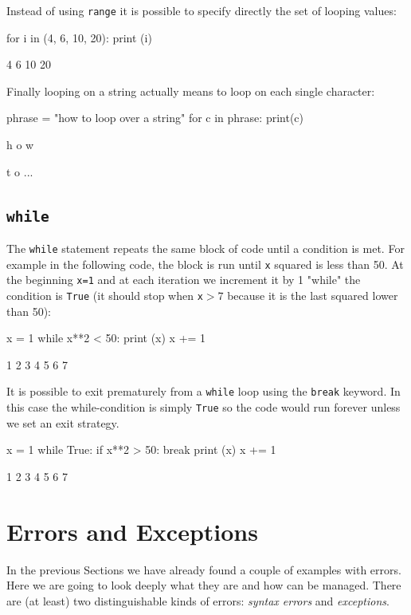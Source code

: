 Instead of using \texttt{range} it is possible to specify directly the set of looping values:

\begin{ipythonnon}
for i in (4, 6, 10, 20):
    print (i)	
\end{ipythonnon}
\begin{ioutput}
4
6
10
20	
\end{ioutput}

Finally looping on a string actually means to loop on each single character:
 
\begin{ipythonnon}
phrase = "how to loop over a string"
for c in phrase:
    print(c) 	
\end{ipythonnon}
\begin{ioutput}
h
o
w

t
o
...
\end{ioutput}
 
\subsection{\texttt{while}}\label{while}

The \texttt{while} statement repeats the same block of code until a condition is met. For example in the following code, the block is run until \texttt{x} squared is less than 50. At the beginning \texttt{x=1} and at each iteration we increment it by 1 "while" the condition is \texttt{True} (it should stop when \texttt{x}$> 7$ because it is the last squared lower than 50):

\begin{ipythonnon}
x = 1
while x**2 < 50:
    print (x)
    x += 1	
\end{ipythonnon}
\begin{ioutput}
1
2
3
4
5
6
7	
\end{ioutput}

It is possible to exit prematurely from a \texttt{while} loop using the \texttt{break} keyword. In this case the while-condition is simply \texttt{True} so the code would run forever unless we set an exit strategy.

\begin{ipythonnon}
x = 1
while True:
    if x**2 > 50:
        break
    print (x)
    x += 1	
\end{ipythonnon}
\begin{ioutput}
1
2
3
4
5
6
7	
\end{ioutput}

\section{Errors and Exceptions}
In the previous Sections we have already found a couple of examples with errors. Here we are going to look deeply what they are and how can be managed. There are (at least) two distinguishable kinds of errors:  \emph{syntax errors} and \emph{exceptions}.

